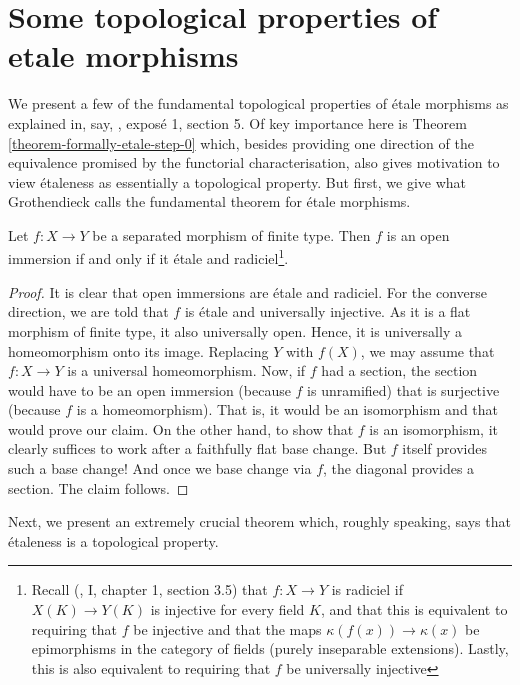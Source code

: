 \section{Some topological properties of etale morphisms}
\label{section-topological-etale}

\noindent
We present a few of the fundamental topological properties of \'etale
morphisms as explained in, say, \cite{SGA1}, expos\'e 1, section 5. Of key
importance here is Theorem \ref{theorem-formally-etale-step-0} which, besides
providing one direction of the equivalence promised by the functorial
characterisation, also gives motivation to view \'etaleness as essentially
a topological property. But first, we give what Grothendieck calls the
fundamental theorem for \'etale morphisms.

\begin{theorem}
\label{theorem-etale-radiciel-open}
Let $f : X \to Y$ be a separated morphism of finite type. Then $f$ is an open
immersion if and only if it \'etale and
radiciel\footnote{Recall (\cite{EGA}, I, chapter 1, section 3.5) that
$f : X \to Y$ is radiciel if $X(K) \to Y(K)$ is injective for every field $K$,
and that this is equivalent to requiring that $f$ be injective and that the
maps $\kappa(f(x)) \to \kappa(x)$ be epimorphisms in the category of fields
(purely inseparable extensions). Lastly, this is also equivalent to requiring
that $f$ be universally injective}.
\end{theorem}

\begin{proof}
It is clear that open immersions are \'etale and radiciel. For the converse
direction, we are told that $f$ is \'etale and universally injective. As it
is a flat morphism of finite type, it also universally open. Hence, it is
universally a homeomorphism onto its image. Replacing $Y$ with $f(X)$, we may
assume that $f : X \to Y$ is a universal homeomorphism.  Now, if $f$ had a
section, the section would have to be an open immersion (because $f$ is
unramified) that is surjective (because $f$ is a homeomorphism). That is, it
would be an isomorphism and that would prove our claim. On the other hand, to
show that $f$ is an isomorphism, it clearly suffices to work after a faithfully
flat base change. But $f$ itself provides such a base change! And once we base
change via $f$, the diagonal provides a section. The claim follows.
\end{proof}

\noindent
Next, we present an extremely crucial theorem which, roughly speaking, says
that \'etaleness is a topological property.

